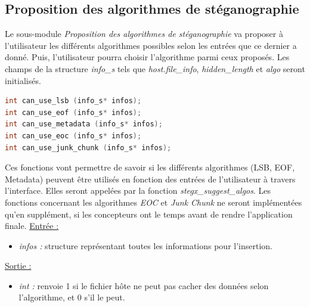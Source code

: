 \documentclass[11pt]{article}
\begin{document}

\subsection{Proposition des algorithmes 
de stéganographie}

Le sous-module \textit{Proposition des algorithmes de stéganographie} va 
proposer à l'utilisateur les différents algorithmes possibles 
selon les entrées que ce dernier a donné. Puis, l'utilisateur pourra choisir 
l'algorithme parmi ceux proposés.
Les champs de la structure \textit{info\_s} tels que \textit{host.file\_info}, 
\textit{hidden\_length} et \textit{algo} seront initialisés. 
\newline

\begin{lstlisting}[language=c]
int can_use_lsb (info_s* infos);
int can_use_eof (info_s* infos);
int can_use_metadata (info_s* infos);
int can_use_eoc (info_s* infos);
int can_use_junk_chunk (info_s* infos);
\end{lstlisting}

Ces fonctions vont permettre de savoir si les différents algorithmes 
(LSB, EOF, Metadata) peuvent être utilisés en fonction des entrées 
de l'utilisateur à travers l'interface. 
Elles seront appelées par la fonction \textit{stegx\_suggest\_algos}. 
Les fonctions concernant les algorithmes \textit{EOC} et \textit{Junk Chunk} 
ne seront implémentées qu'en supplément, si les concepteurs ont le temps 
avant de rendre l'application finale. 
\newline
\underline{Entrée :} 
\begin{itemize}
\item \textit{infos :} structure représentant toutes les informations pour 
l'insertion.  
\end{itemize}
\underline{Sortie :} 
\begin{itemize}
\item \textit{int :} renvoie 1 si le fichier hôte ne peut pas cacher des 
données selon l'algorithme, et 0 s'il le peut. 
\newline 
\end{itemize}
\end{document}
